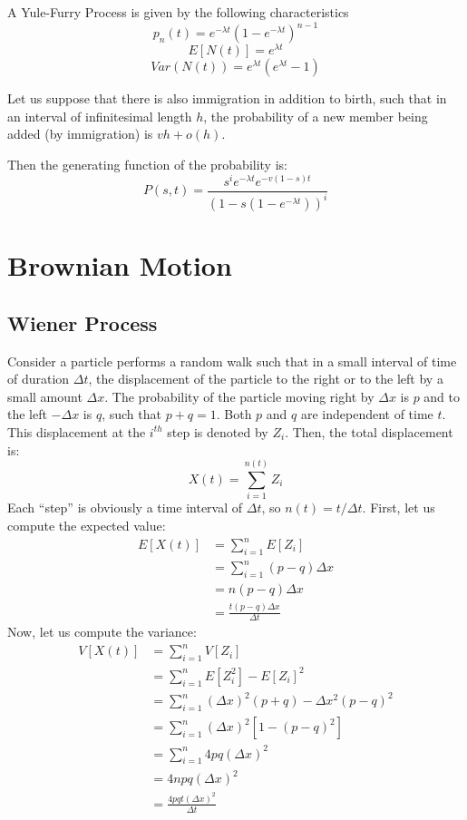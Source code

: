 \documentclass[12pt,letterpaper]{book}
\theoremstyle{definition}
\begin{document}
\begin{theorem}
  A Yule-Furry Process is given by the following characteristics
  \[p_n(t) = e^{-\lambda t} (1 - e^{-\lambda t})^{n-1}\] 
  \[E[N(t)] = e^{\lambda t}\] 
  \[Var(N(t)) = e^{\lambda t} (e^{\lambda t} - 1)\]
\end{theorem}

Let us suppose that there is also immigration in addition to birth, such that in an interval of infinitesimal length $h$, the probability of a new member being added (by immigration) is $vh + o(h)$.

Then the generating function of the probability is:
\[P(s,t) = \frac{s^i e^{-\lambda t} e^{-v(1-s)t}}{(1 - s(1- e^{-\lambda t}))^i}\]

\chapter{Brownian Motion}

\section{Wiener Process}

Consider a particle performs a random walk such that in a small interval of time of duration $\Delta t$, the displacement of the particle to the right or to the left by a small amount $\Delta x$. The probability of the particle moving right by $\Delta x$ is $p$ and to the left $- \Delta x$ is $q$, such that $p+q = 1$. Both $p$ and $q$ are independent of time $t$. This displacement at the $i^{th}$ step is denoted by $Z_i$. Then, the total displacement is:
\[X(t) = \sum_{i = 1}^{n(t)} Z_i\]
Each ``step'' is obviously a time interval of $\Delta t$, so $n(t) = t / \Delta t$. First, let us compute the expected value:
\begin{align*}
  E[X(t)] &= \sum_{i = 1}^n E[Z_i]\\
          &= \sum_{i=1}^n (p-q) \Delta x \\
          &= n (p-q) \Delta x\\ 
          &= \frac{t(p-q) \Delta x}{\Delta t}
\end{align*}
Now, let us compute the variance:
\begin{align*}
  V[X(t)]  &= \sum_{i=1}^n V[Z_i] \\
           &= \sum_{i=1}^n E[Z_i^2] - E[Z_i]^2 \\
           &= \sum_{i=1}^n (\Delta x)^2 (p+q) - \Delta x^2 (p-q)^2\\
           &= \sum_{i=1}^n (\Delta x)^2 [1 - (p-q)^2]\\
           &= \sum_{i=1}^n4 pq (\Delta x)^2 \\
           &= 4 npq (\Delta x)^2 \\
           &= \frac{4 p q t (\Delta x)^2}{\Delta t}
\end{align*}
\end{document}
